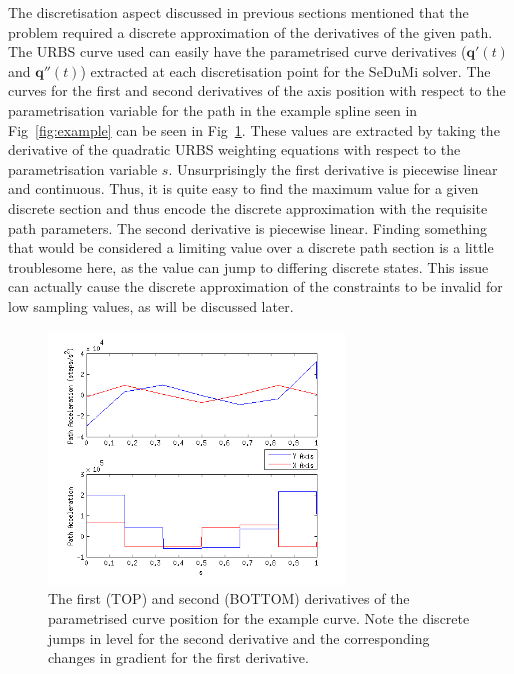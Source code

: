 The discretisation aspect discussed in previous sections mentioned that the problem required a discrete approximation of the derivatives of the given path. The URBS curve used can easily have the parametrised curve derivatives ($\textbf{q}'(t)$ and $\textbf{q}''(t)$) extracted at each discretisation point for the SeDuMi solver. The curves for the first and second derivatives of the axis position with respect to the parametrisation variable for the path in the example spline seen in Fig~\ref{fig:example} can be seen in Fig~\ref{fig:xy_dds_ds}. These values are extracted by taking the derivative of the quadratic URBS weighting equations with respect to the parametrisation variable $s$.
Unsurprisingly the first derivative is piecewise linear and continuous. Thus, it is quite easy to find the maximum value for a given discrete section and thus encode the discrete approximation with the requisite path parameters.
The second derivative is piecewise linear. Finding something that would be considered a limiting value over a discrete path section is a little troublesome here, as the value can jump to differing discrete states. This issue can actually cause the discrete approximation of the constraints to be invalid for low sampling values, as will be discussed later.

\begin{figure}[htbp]
\centering
\includegraphics[width=0.7\textwidth]{figures/optimisation/xy_dds_ds.png}
\caption[Parametrised curve derivatives]{
The first (TOP) and second (BOTTOM) derivatives of the parametrised curve position for the example curve. Note the discrete jumps in level for the second derivative and the corresponding changes in gradient for the first derivative.
\label{fig:xy_dds_ds}}
\end{figure}

